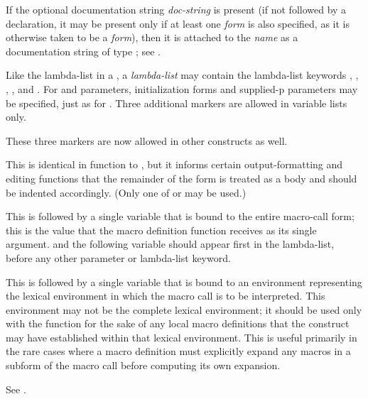 \begin{defmac}
If the optional documentation string \emph{doc-string} is present (if not
followed by a declaration, it may be
present only if at least one \emph{form} is also specified, as it is
otherwise taken to be a \emph{form}), then it is attached to the \emph{name}
as a documentation string of type ; see .

\begin{obsolete}
Like the lambda-list in a , a  \emph{lambda-list} may contain
the lambda-list keywords , , ,
, and .
For  and  parameters, initialization forms and
supplied-p parameters may be specified, just as for .
Three additional markers
are allowed in  variable lists only.
\end{obsolete}
\begin{new}
These three markers are now allowed in other constructs as well.
\end{new}
\begin{indentdesc}{6pc}
\item[\cd{\&body}]
This is identical in function to , but it informs certain
output-formatting and editing functions that the remainder of the form is
treated as a body and should be indented accordingly.
(Only one of  or  may be used.)

\item[\cd{\&whole}]
This is followed by a single variable that is bound to the
entire macro-call form; this is the value that the macro definition function
receives as its single argument.
 and the following variable should appear first in the lambda-list,
before any other parameter or lambda-list keyword.

\item[\cd{\&environment}]
This is followed by a single variable that is bound
to an environment representing the lexical environment in which the
macro call is to be interpreted.   This environment may not be the
complete lexical environment; it should be used only with
the function  for the sake of any local
macro definitions that the  construct may have
established within that lexical environment.  This is useful primarily
in the rare cases where a macro definition must explicitly expand any macros
in a subform of the macro call before computing its own expansion.
\end{indentdesc}
See .


\end{defmac}
